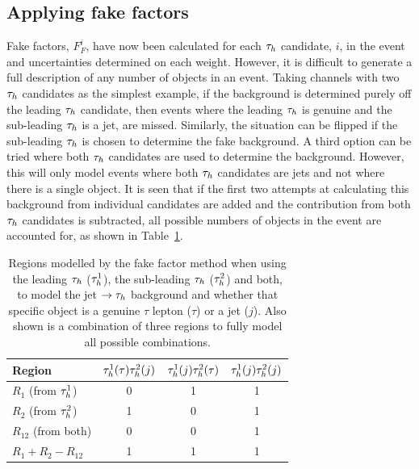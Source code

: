 \subsection{Applying fake factors}

Fake factors, $F_{F}^{i}$, have now been calculated for each $\tauh$ candidate, $i$, in the event and uncertainties determined on each weight. 
However, it is difficult to generate a full description of any number of \jtth objects in an event.
Taking channels with two $\tauh$ candidates as the simplest example, if the \jtth background is determined purely off the leading $\tauh$ candidate, then events where the leading $\tauh$ is genuine and the sub-leading $\tauh$ is a jet, are missed.
Similarly, the situation can be flipped if the sub-leading $\tauh$ is chosen to determine the \jtth fake background.
A third option can be tried where both $\tauh$ candidates are used to determine the background.
However, this will only model events where both $\tauh$ candidates are jets and not where there is a single \jtth object. 
It is seen that if the first two attempts at calculating this background from individual candidates are added and the contribution from both $\tauh$ candidates is subtracted, all possible numbers of \jtth objects in the event are accounted for, as shown in Table~\ref{tab:apply_ff}. \\

\begin{table}[H]
\centering
\begin{tabular}{|l|ccc|}
\hline
Region    & $\tau_{h}^1 (\tau) \tau_{h}^2 (j)$ & $\tau_{h}^1 (j) \tau_{h}^2 (\tau)$ & $\tau_{h}^1 (j) \tau_{h}^2 (j)$ \\
\hline
\hline
$R_{1}$ (from $\tau_{h}^1$)     & 0                            & 1                            & 1                         \\
$R_{2}$ (from $\tau_{h}^2$)     & 1                            & 0                            & 1                         \\
$R_{12}$ (from both)         & 0                            & 0                            & 1                         \\
\hline
$R_{1} +R_{2} - R_{12}$      & 1                            & 1                            & 1       \\                  
\hline
\end{tabular}
\caption[Regions modelled by the fake factor method using different $\tauh$ objects.]{Regions modelled by the fake factor method when using the leading $\tauh$ ($\tau_{h}^1$), the sub-leading $\tauh$ ($\tau_{h}^2$) and both, to model the jet $\rightarrow \tau_{h}$ background and whether that specific object is a genuine $\tau$ lepton ($\tau$) or a jet ($j$). Also shown is a combination of three regions to fully model all possible combinations. }
\label{tab:apply_ff}
\end{table}

